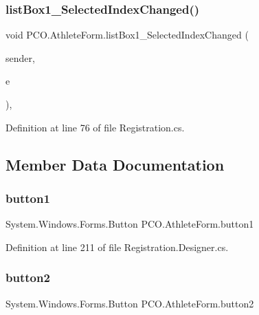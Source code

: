 \subsubsection{\texorpdfstring{list\+Box1\+\_\+\+Selected\+Index\+Changed()}{listBox1\_SelectedIndexChanged()}}
{\footnotesize\ttfamily void P\+C\+O.\+Athlete\+Form.\+list\+Box1\+\_\+\+Selected\+Index\+Changed (\begin{DoxyParamCaption}\item[{object}]{sender,  }\item[{Event\+Args}]{e }\end{DoxyParamCaption})\hspace{0.3cm}{\ttfamily [inline]}, {\ttfamily [private]}}



Definition at line 76 of file Registration.\+cs.



\subsection{Member Data Documentation}
\mbox{\label{classPCO_1_1AthleteForm_a86a9772f0dad39f77e94c939ab082981}} 
\subsubsection{\texorpdfstring{button1}{button1}}
{\footnotesize\ttfamily System.\+Windows.\+Forms.\+Button P\+C\+O.\+Athlete\+Form.\+button1\hspace{0.3cm}{\ttfamily [private]}}



Definition at line 211 of file Registration.\+Designer.\+cs.

\mbox{\label{classPCO_1_1AthleteForm_ac0941ee382a48135f96a0199520a6e0f}} 
\subsubsection{\texorpdfstring{button2}{button2}}
{\footnotesize\ttfamily System.\+Windows.\+Forms.\+Button P\+C\+O.\+Athlete\+Form.\+button2\hspace{0.3cm}{\ttfamily [private]}}



